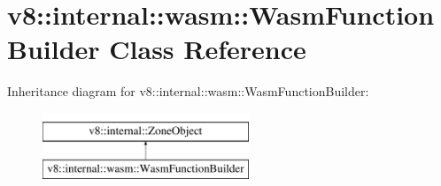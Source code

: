 \hypertarget{classv8_1_1internal_1_1wasm_1_1WasmFunctionBuilder}{}\section{v8\+:\+:internal\+:\+:wasm\+:\+:Wasm\+Function\+Builder Class Reference}
\label{classv8_1_1internal_1_1wasm_1_1WasmFunctionBuilder}
Inheritance diagram for v8\+:\+:internal\+:\+:wasm\+:\+:Wasm\+Function\+Builder\+:\begin{figure}[H]
\begin{center}
\leavevmode
\includegraphics[height=2.000000cm]{classv8_1_1internal_1_1wasm_1_1WasmFunctionBuilder}
\end{center}
\end{figure}
